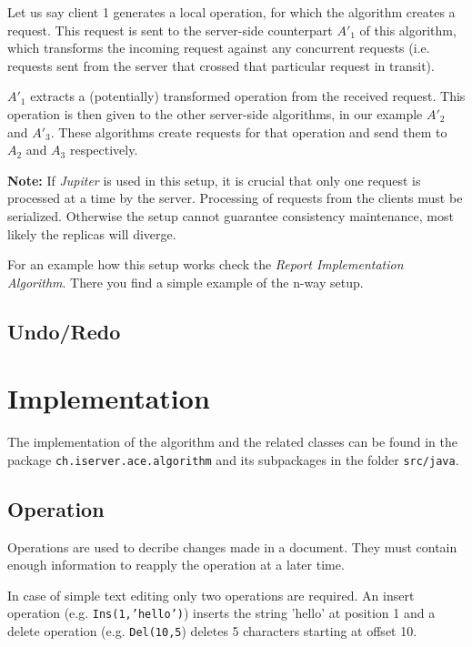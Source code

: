 Let us say client 1 generates a local operation, for which the algorithm
creates a request. This request is sent to the server-side counterpart $A'_1$ of
this algorithm, which transforms the incoming request against any concurrent
requests (i.e. requests sent from the server that crossed that particular 
request in transit).

$A'_1$ extracts a (potentially) transformed operation from the received 
request. This operation is then given to the other server-side algorithms,
in our example $A'_2$ and $A'_3$. These algorithms create
requests for that operation and send them to $A_2$ and $A_3$ respectively.

\textbf{Note:} If \emph{Jupiter} is used in this setup, it is crucial that
only one request is processed at a time by the server. Processing of
requests from the clients must be serialized. Otherwise the setup cannot
guarantee consistency maintenance, most likely the replicas will diverge.

For an example how this setup works check the 
\emph{Report Implementation Algorithm}. There you find a simple example
of the n-way setup.


\subsection{Undo/Redo}
\label{sect:algorithm.undoredo}
% 
%



\section{Implementation}
The implementation of the algorithm and the related classes can be found
in the package \texttt{ch.\-iserver.\-ace.\-algorithm} and its subpackages
in the folder \texttt{src/java}.

\subsection{Operation}
Operations are used to decribe changes made in a document. They must contain
enough information to reapply the operation at a later time.

In case of simple text editing only two operations are required. An insert 
operation (e.g. \texttt{Ins(1,'hello')}) inserts the string 'hello' at position 
1 and a delete operation (e.g. \texttt{Del(10,5}) deletes 5 characters
starting at offset 10.

